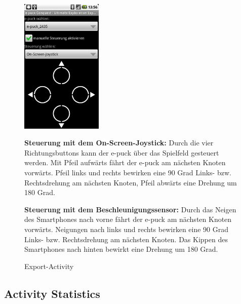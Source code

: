 \documentclass[10pt,a4paper]{article}
\begin{document}
\begin{enumerate}
			\begin{figure}[htbp]
				\begin{minipage}[t]{6.5cm}
					\vspace{10pt}
					\includegraphics[height=6.5cm]{images/steer.png} 
					\caption{Export-Activity}
				\end{minipage}
				\hfill
				\begin{minipage}[t]{0.5\textwidth}
					\vspace{10pt}
					\item \textbf{Steuerung mit dem On-Screen-Joystick:} Durch die vier Richtungsbuttons kann der e-puck über das Spielfeld gesteuert werden.
 					Mit Pfeil aufwärts fährt der e-puck am nächsten Knoten vorwärts. Pfeil links und rechts bewirken eine 90 Grad Links- bzw. Rechtsdrehung
 					am nächsten Knoten, Pfeil abwärts eine Drehung um 180 Grad.
 					\item \textbf{Steuerung mit dem Beschleunigungssensor:}
 					Durch das Neigen des Smartphones nach vorne fährt der e-puck am nächsten Knoten vorwärts. Neigungen nach links und rechts bewirken eine
 					90 Grad Links- bzw. Rechtsdrehung am nächsten Knoten. Das Kippen des Smartphones nach hinten bewirkt eine Drehung um 180 Grad.
				\end{minipage}
   			\end{figure} 	 			
 			
 			
 		\end{enumerate}
 		\newpage
	\subsection{Activity Statistics}
 		
\end{document}

